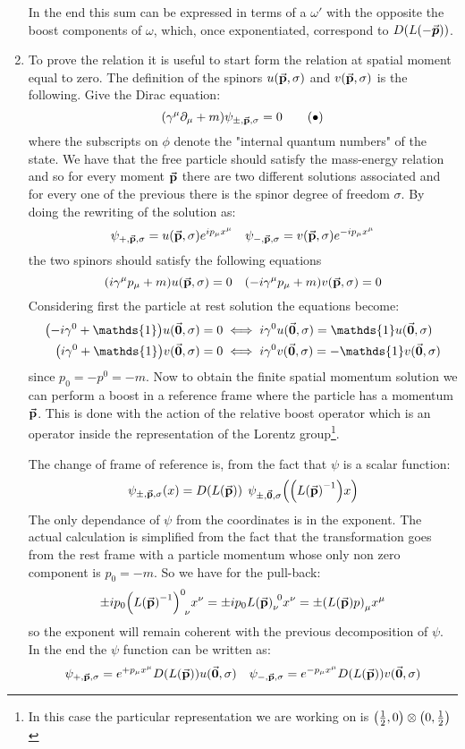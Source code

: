 \documentclass[11pt, oneside]{article}   	%
\begin{document}
\begin{enumerate}[label=\alph*)]
In the end this sum can be expressed in terms of a $\omega'$ with the opposite the boost components of $\omega$, which, once exponentiated, correspond to $D\qty(L(-\va*{p}))$.

\item To prove the relation it is useful to start form the relation at spatial moment equal to zero. The definition of the spinors $u(\va{p}, \sigma)$ and $v(\va{p}, \sigma)$ is the following. Give the Dirac equation:
\[
	\qty(\gamma^\mu \partial_\mu  + m) \psi_{\pm, \va{p}, \sigma} = 0 \label{eq:dirac} \tag{$\bullet$}
\]
where the subscripts on $\phi$ denote the "internal quantum numbers" of the state. We have that the free particle should satisfy the mass-energy relation and so for every moment $\va{p}$ there are two different solutions associated and for every one of the previous there is the spinor degree of freedom $\sigma$. By doing the rewriting of the solution as:
\[
	\psi_{+, \va{p}, \sigma} = u(\va{p}, \sigma) e^{ip_\mu x^\mu} \quad \psi_{-, \va{p}, \sigma} = v(\va{p}, \sigma) e^{-ip_\mu x^\mu}
\]
the two spinors should satisfy the following equations
\[
	\qty(i\gamma^\mu p_\mu + m)u(\va{p}, \sigma) = 0 \quad \qty(-i\gamma^\mu p_\mu + m)v(\va{p}, \sigma) = 0
\]
Considering first the particle at rest solution the equations become:
\begin{align*}
	\qty(-i\gamma^0 + \mathds{1}) u(\va{0}, \sigma) = 0 &\iff i\gamma^0 u(\va{0}, \sigma) =\mathds{1} u(\va{0}, \sigma) \\ 
	\qty(i\gamma^0 + \mathds{1}) v(\va{0}, \sigma) = 0 &\iff i\gamma^0 v(\va{0}, \sigma) = -\mathds{1} v(\va{0}, \sigma)
\end{align*}
since $p_0 = -p^0 = -m$. Now to obtain the finite spatial momentum solution we can perform a boost in a reference frame where the particle has a momentum $\va{p}$. This is done with the action of the relative boost operator which is an operator inside the representation of the Lorentz group\footnote{In this case the particular representation we are working on is $\qty(\frac{1}{2},0) \otimes \qty(0, \frac{1}{2})$}.

The change of frame of reference is, from the fact that $\psi$ is a scalar function:
\[
	\psi_{\pm, \va{p}, \sigma}\qty( x ) = D\qty(L\qty(\va{p})) \:\: \psi_{\pm, \va{0}, \sigma}\qty( \qty(L\qty(\va{p})^{-1}) x )
\]
The only dependance of $\psi$ from the coordinates is in the exponent. The actual calculation is simplified from the fact that the transformation goes from the rest frame with a particle momentum whose only non zero component is $p_0 = -m$. So we have for the pull-back:
\[
	\pm ip_0 \qty(L\qty(\va{p})^{-1})^{0}_{~\nu} x^\nu =  \pm i p_0 L\qty(\va{p})^{~0}_\nu x^{\nu} = \pm \qty(L(\va{p}) p)_\mu x^\mu
\]
so the exponent will remain coherent with the previous decomposition of $\psi$. In the end the $\psi$ function can be written as:
\[
	\psi_{+, \va{p}, \sigma} = e^{+ p_\mu x^\mu} D\qty(L\qty(\va{p})) u(\va{0}, \sigma) \quad \psi_{-, \va{p}, \sigma} = e^{- p_\mu x^\mu} D\qty(L\qty(\va{p})) v (\va{0}, \sigma)
\]


\end{enumerate}
\end{document}
